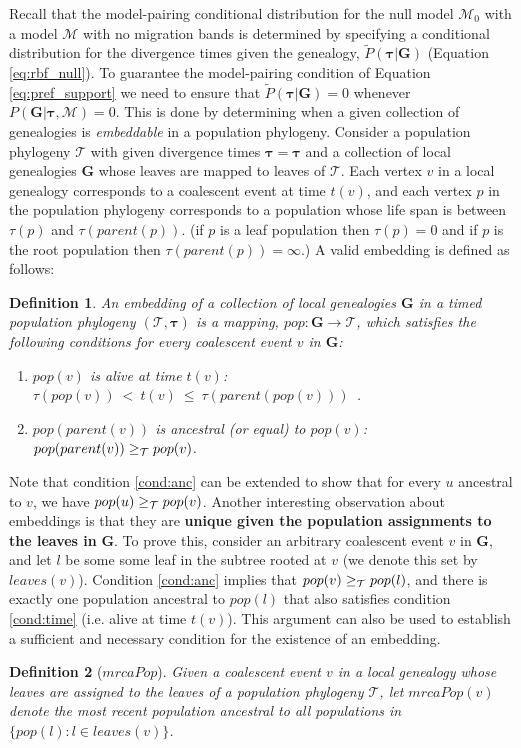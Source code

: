 \documentclass[11pt]{article}
\newcommand{\vect}[1]{\boldsymbol{\mathbf{#1}}}
\newcommand{\M}{\mathcal{M}}
\newcommand{\Tr}{\mathcal{T}}
\newcommand{\G}{\vect{G}}
\newcommand{\Pref}{\widetilde{P}}
\newcommand{\1}{\mathbbm{1}}
\newtheorem{definition}{Definition}
\newcommand{\taus}{\vect\tau}
\begin{document}
Recall that the model-pairing conditional distribution for the null model $\M_0$ with a model $\M$ with no migration bands is determined by specifying a conditional
distribution for the divergence times given the genealogy, $\Pref(\taus|\G)$ (Equation \ref{eq:rbf_null}).
%
To guarantee the model-pairing condition of Equation \ref{eq:pref_support} we need to ensure that  $\Pref(\taus|\G)=0$ whenever $P(\G|\taus,\M)=0$.
%
This is done by determining when a given collection of genealogies is \emph{embeddable} in a population phylogeny.
%
Consider a population phylogeny $\Tr$ with given divergence times $\taus=\taus$ and a collection of local genealogies $\G$ whose leaves are mapped to
leaves of $\Tr$.
%
Each vertex $v$ in a local genealogy corresponds to a coalescent event at time $t(v)$, and each vertex $p$ in the population phylogeny corresponds to a population
whose life span is between $\tau(p)$ and $\tau(parent(p))$. (if $p$ is a leaf population then $\tau(p)=0$ and if $p$ is the root population then $\tau(parent(p))=\infty$.)
%
A valid embedding is defined as follows:
%
\begin{definition}\label{def:embed}
 An embedding of a collection of local genealogies $\G$ in a timed population phylogeny $(\Tr,\taus)$ is a mapping, $pop:\G\rightarrow\Tr$,
 which satisfies the following conditions for every coalescent event $v$ in $\G$:
 \begin{enumerate}
  \item $pop(v)$ is alive at time $t(v)$:~~ $\tau(pop(v)) ~<~ t(v) ~\leq~ \tau(parent(pop(v)))$~.\label{cond:time}
  \item $pop(parent(v))$ is ancestral (or equal) to $pop(v)$:~~ $pop(parent(v)) \anc pop(v)$.\label{cond:anc}
 \end{enumerate}
\end{definition}

Note that condition \ref{cond:anc} can be extended to show that for every $u$ ancestral to $v$, we have $pop(u) \anc pop(v)$.
%
Another interesting observation about embeddings is that they are \textbf{unique given the population assignments to the leaves in} $\G$.
%
To prove this, consider an arbitrary coalescent event $v$ in $\G$, and let $l$ be some some leaf in the subtree rooted at $v$ (we denote this set by $leaves(v)$).
%
Condition \ref{cond:anc} implies that $pop(v) \anc pop(l)$, and there is exactly one population ancestral to $pop(l)$ that also satisfies condition \ref{cond:time} (i.e. alive at time $t(v)$).
%
This argument can also be used to establish a sufficient and necessary condition for the existence of an embedding.
%
\begin{definition}[$mrcaPop$]\label{def:tmrca_pop}
 Given a coalescent event $v$ in a local genealogy whose leaves are assigned to the leaves of a population phylogeny $\Tr$,
 let ${mrcaPop(v)}$ denote the most recent population ancestral to all populations in $\{pop(l):l\in leaves(v)\}$.
\end{definition}
\end{document}
